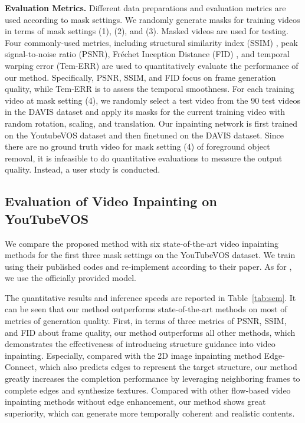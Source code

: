 \noindent \textbf{Evaluation Metrics.} 
Different data preparations and evaluation metrics are used according to mask settings. We randomly generate masks for training videos in terms of mask settings (1), (2), and (3). 
Masked videos are used for testing.
Four commonly-used metrics, including structural similarity index (SSIM) \cite{wang2004image}, peak signal-to-noise ratio (PSNR), Fr{\'e}chet Inception Distance (FID) \cite{heusel2017gans}, and temporal warping error (Tem-ERR) \cite{Kim_2019_CVPR} are used to quantitatively evaluate the performance of our method. 
{\color{blue}Specifically, PSNR, SSIM, and FID focus on frame generation quality, while Tem-ERR is to assess the temporal smoothness.} 
For each training video at mask setting (4), we randomly select a test video from the 90 test videos in the DAVIS dataset and apply its masks for the current training video with random rotation, scaling, and translation.
Our inpainting network is first trained on the YoutubeVOS dataset and then finetuned on the DAVIS dataset. 
Since there are no ground truth video for mask setting (4) of foreground object removal, it is infeasible to do quantitative evaluations to measure the output quality. Instead, a user study is conducted.  




\subsection{Evaluation of Video Inpainting on YouTubeVOS}
We compare the proposed method with six state-of-the-art video inpainting methods \cite{nazeri2019edgeconnect,wang2019video,Kim_2019_CVPR1,Xu_2019_CVPR,lee2019copy,oh2019onion}
for the first three mask settings on the YouTubeVOS dataset.
%
We train \cite{nazeri2019edgeconnect,Xu_2019_CVPR} using their published codes and re-implement \cite{wang2019video} according to their paper. As for \cite{Kim_2019_CVPR1,lee2019copy,oh2019onion}, we use the officially provided model.


The quantitative results and inference speeds are reported in Table~\ref{tab:sem}.
It can be seen that our method outperforms state-of-the-art methods on most of metrics of generation quality.
First, in terms of three metrics of PSNR, SSIM, and FID about frame quality, our method outperforms all other methods, which demonstrates the effectiveness of introducing structure guidance into video inpainting.
Especially, compared with the 2D image inpainting method Edge-Connect\cite{nazeri2019edgeconnect}, which also predicts edges to represent the target structure, our method greatly increases the completion performance by leveraging neighboring frames to complete edges and synthesize textures. 
Compared with other flow-based video inpainting methods without edge enhancement, our method shows great superiority, which can generate more temporally coherent and realistic contents. 

